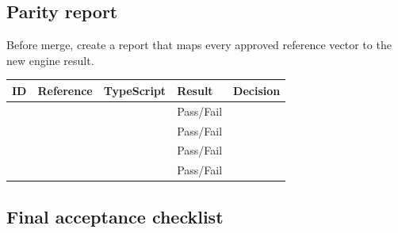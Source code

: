 \documentclass[11pt,letterpaper]{article}
\begin{document}
\subsection{Parity report}

Before merge, create a report that maps every approved reference vector to the
new engine result.

\begin{longtable}{L{0.55in}L{1.45in}L{1.45in}L{0.9in}L{1.1in}}
\toprule
\textbf{ID} & \textbf{Reference} & \textbf{TypeScript} & \textbf{Result} & \textbf{Decision} \\
\midrule
 & & & Pass/Fail & \\
 & & & Pass/Fail & \\
 & & & Pass/Fail & \\
 & & & Pass/Fail & \\
\bottomrule
\end{longtable}

\subsection{Final acceptance checklist}
\end{document}
